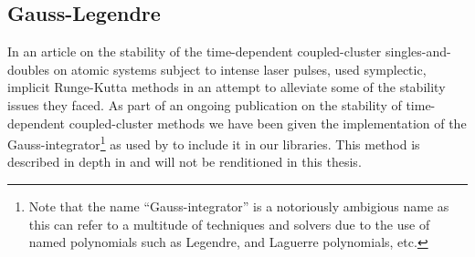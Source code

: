         \subsection{Gauss-Legendre}
            In an article on the stability of the time-dependent coupled-cluster
            singles-and-doubles on atomic systems subject to intense laser
            pulses, \citeauthor{pedersen2018symplectic}
            \cite{pedersen2018symplectic} used symplectic, implicit Runge-Kutta
            methods in an attempt to alleviate some of the stability issues they
            faced.
            As part of an ongoing publication on the stability of time-dependent
            coupled-cluster methods \cite{oa-stability} we have been given the
            implementation of the Gauss-integrator\footnote{%
                Note that the name ``Gauss-integrator'' is a notoriously
                ambigious name as this can refer to a multitude of techniques
                and solvers due to the use of named polynomials such as
                Legendre, and Laguerre polynomials, etc.%
            } as used by \citeauthor{pedersen2018symplectic}
            \cite{pedersen2018symplectic} to include it in our libraries.
            This method is described in depth in
             \cite{pedersen2018symplectic} and
            will not be renditioned in this thesis.
